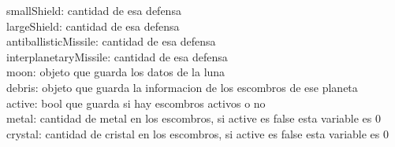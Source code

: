 \documentclass{article}
\newcommand\tab[1][1cm]{\hspace*{#1}}
\begin{document}
            \tab\tab smallShield: cantidad de esa defensa\\
            \tab\tab largeShield: cantidad de esa defensa\\
            \tab\tab antiballisticMissile: cantidad de esa defensa\\
            \tab\tab interplanetaryMissile: cantidad de esa defensa\\
            \tab moon: objeto que guarda los datos de la luna\\
            \tab debris: objeto que guarda la informacion de los escombros de ese planeta\\
            \tab\tab active: bool que guarda si hay escombros activos o no\\
            \tab\tab metal: cantidad de metal en los escombros, si active es false esta variable es 0\\
            \tab\tab crystal: cantidad de cristal en los escombros, si active es false esta variable es 0\\
\end{document}
